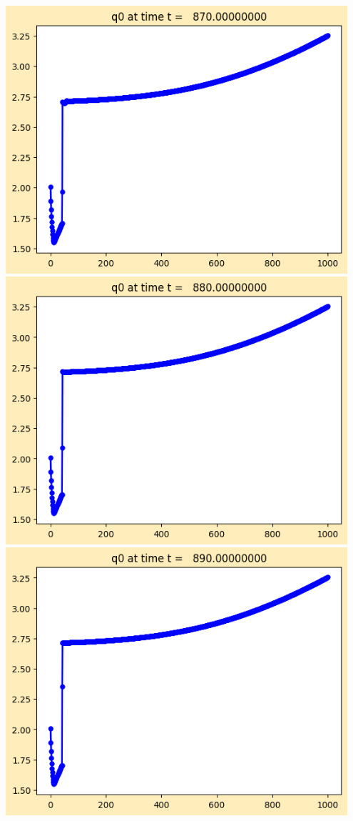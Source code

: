 \documentclass[11pt]{article}
\begin{document}
\vskip 10pt 
\includegraphics[width=0.95\textwidth]{frame0087fig1.png}
\vskip 10pt 
\includegraphics[width=0.95\textwidth]{frame0088fig1.png}
\vskip 10pt 
\includegraphics[width=0.95\textwidth]{frame0089fig1.png}
\end{document}

